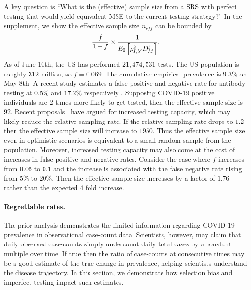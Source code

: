 \documentclass[12pt]{article}
\def\I{{\bf I}}
\begin{document}
A key question is ``What is the (effective) sample size from a SRS with perfect testing that would yield equivalent MSE to the current testing strategy?'' In the supplement, we show the effective sample size $n_{eff}$ can be bounded by
$$
\frac{f}{1-f} \times \frac{1}{E_{\I} \left[ \rho_{I,Y}^2 D_M^2 \right]}.
$$
As of June 10th, the US has performed $21,474,531$ tests.  The US population is roughly $312$ million, so $f = 0.069$.  The cumulative empirical prevalence is $9.3\%$ on May 8th. A recent study estimates a false positive and negative rate for antibody testing at $0.5$\% and $17.2$\% respectively \cite{Bendavid2020}. Supposing COVID-19 positive individuals are $2$ times more likely to get tested, then the effective sample size is $92$.  Recent proposals~\cite{Siddarth2020} have argued for increased testing capacity, which may likely reduce the relative sampling rate.  If the relative sampling rate drops to $1.2$ then the effective sample size will increase to $1950$.  Thus the effective sample size even in optimistic scenarios is equivalent to a small random sample from the population.  Moreover, increased testing capacity may also come at the cost of increases in false positive and negative rates.  Consider the case where $f$ increases from $0.05$ to $0.1$ and the increase is associated with the false negative rate rising from $5\%$ to $20$\%.  Then the effective sample size increases by a factor of $1.76$ rather than the expected $4$ fold increase.

\paragraph*{Regrettable rates.}

The prior analysis demonstrates the limited information regarding COVID-19 prevalence in observational case-count data.  Scientists, however, may claim that daily observed case-counts simply undercount daily total cases by a constant multiple over time.  If true then the ratio of case-counts at consecutive times may be a good estimate of the true change in prevalence, helping scientists understand the disease trajectory.  In this section, we demonstrate how selection bias and imperfect testing impact such estimates.
\end{document}

